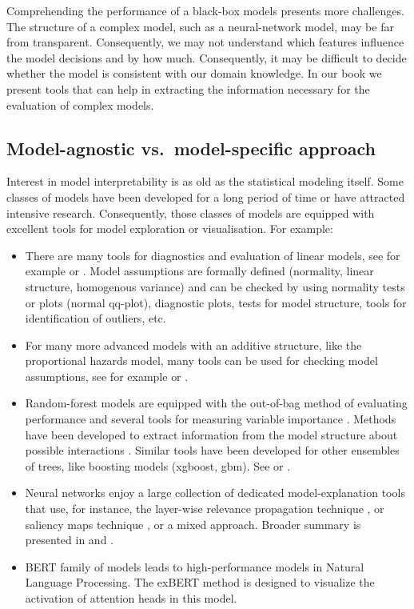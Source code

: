 \documentclass[12pt,]{krantz}
\providecommand{\tightlist}{%
  \setlength{\itemsep}{0pt}\setlength{\parskip}{0pt}}
\begin{document}
Comprehending the performance of a black-box models presents more challenges. The structure of a complex model, such as a neural-network model, may be far from transparent. Consequently, we may not understand which features influence the model decisions and by how much. Consequently, it may be difficult to decide whether the model is consistent with our domain knowledge. In our book we present tools that can help in extracting the information necessary for the evaluation of complex models.

\hypertarget{model-agnostic-vs.-model-specific-approach}{%
\subsection{Model-agnostic vs.~model-specific approach}\label{model-agnostic-vs.-model-specific-approach}}

Interest in model interpretability is as old as the statistical modeling itself.
Some classes of models have been developed for a long period of time or have attracted intensive research. Consequently, those classes of models are equipped with excellent tools for model exploration or visualisation. For example:

\begin{itemize}
\tightlist
\item
  There are many tools for diagnostics and evaluation of linear models, see for example \citep{Galecki2013} or \citep{Faraway02practicalregression}. Model assumptions are formally defined (normality, linear structure, homogenous variance) and can be checked by using normality tests or plots (normal qq-plot), diagnostic plots, tests for model structure, tools for identification of outliers, etc.
\item
  For many more advanced models with an additive structure, like the proportional hazards model, many tools can be used for checking model assumptions, see for example \citep{rms} or \citep{sheather2009modern}.
\item
  Random-forest models are equipped with the out-of-bag method of evaluating performance and several tools for measuring variable importance \citep{R-randomForest}. Methods have been developed to extract information from the model structure about possible interactions \citep{randomForestExplainer}. Similar tools have been developed for other ensembles of trees, like boosting models (xgboost, gbm). See \citep{xgboostExplainer} or \citep{EIXkarbowiak}.
\item
  Neural networks enjoy a large collection of dedicated model-explanation tools that use, for instance, the layer-wise relevance propagation technique \citep{BachLWRP}, or saliency maps technique \citep{SaliencyMaps}, or a mixed approach. Broader summary is presented in \citep{samek2017explainable} and \citep{alber2018innvestigate}.
\item
  BERT family of models leads to high-performance models in Natural Language Processing. The exBERT method \citep{hoover2019exbert} is designed to visualize the activation of attention heads in this model.
\end{itemize}
\end{document}
